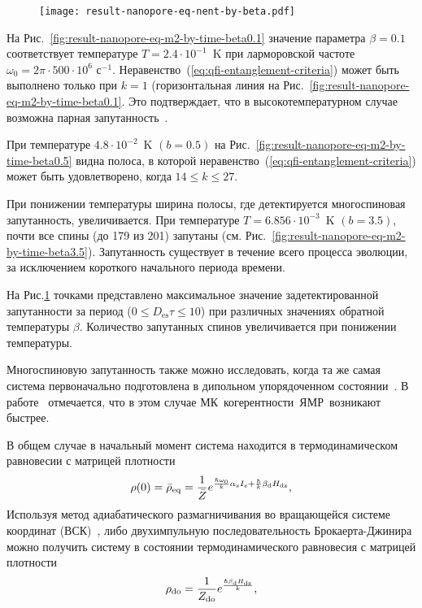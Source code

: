 \begin{figure}
  \texttt{[image: result-nanopore-eq-nent-by-beta.pdf]}
  \caption{\protect}
  \label{fig:result-nanopore-eq-nent-by-beta}
\end{figure}

На Рис.~\ref{fig:result-nanopore-eq-m2-by-time-beta0.1} значение параметра $\beta = 0.1$ соответствует температуре ${T= 2.4\cdot 10^{-1}}$~K при ларморовской частоте $\omega_0 = 2\pi\cdot 500\cdot10^6$ с$^{-1}$.
Неравенство~(\ref{eq:qfi-entanglement-criteria}) может быть выполнено только при $k=1$ (горизонтальная линия на Рис.~\ref{fig:result-nanopore-eq-m2-by-time-beta0.1}.
Это подтверждает, что в высокотемпературном случае возможна парная запутанность~\cite{Feldman2012}.

При температуре ${4.8\cdot10^{-2}}$~K $(b=0.5)$ на Рис.~\ref{fig:result-nanopore-eq-m2-by-time-beta0.5} видна полоса, в которой неравенство~(\ref{eq:qfi-entanglement-criteria}) может быть удовлетворено, когда $14 \leq k \leq 27$.

При понижении температуры ширина полосы, где детектируется многоспиновая запутанность, увеличивается.
При температуре ${T= 6.856\cdot10^{-3}}$~K $(b=3.5)$,
почти все спины (до 179 из 201) запутаны (см. Рис.~\ref{fig:result-nanopore-eq-m2-by-time-beta3.5}).
Запутанность существует в течение всего процесса эволюции, за исключением короткого начального периода времени.

На Рис.\ref{fig:result-nanopore-eq-nent-by-beta} точками представлено максимальное значение задетектированной запутанности за период ($0 \leq D_\mathrm{es}\tau \leq 10$) при различных значениях обратной температуры $\beta$.
Количество запутанных спинов увеличивается при понижении температуры.

Многоспиновую запутанность также можно исследовать,
когда та же самая система первоначально подготовлена в дипольном упорядоченном состоянии~\cite{Goldman1970}.
В работе~\cite{Doronin2011} отмечается,
что в этом случае МК~когерентности~ЯМР~возникают быстрее.

В общем случае в начальный момент система находится в термодинамическом равновесии с матрицей плотности
%
\begin{equation}\label{eq:rho-eq-hdz}
  \rho(0) = \bar\rho_\mathrm{eq} = \dfrac{1}{\bar Z} e^{ \frac{\hslash \omega_{0}}{k} \alpha_\mathrm{z} I_\mathrm{z} + \frac{\hslash }{k} \beta_\mathrm{d} H_\mathrm{dz} },
\end{equation}
\rhoEqHdzExplanatoryNote
%
Используя  метод адиабатического размагничивания во вращающейся системе координат (ВСК)~\cite{Goldman1970, Slichter1961},
либо двухимпульную последовательность Брокаерта-Джинира
можно получить систему в состоянии термодинамического равновесия с матрицей плотности
%
\begin{equation}\label{eq:do-state}
 \rho_\mathrm{do} = \frac{1}{Z_\mathrm{do}} e^\frac{\hslash\beta_\mathrm{d} H_\mathrm{dz}}{k},
\end{equation}
\rhoDoExplanatoryNote

